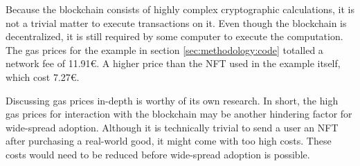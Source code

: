 Because the blockchain consists of highly complex cryptographic calculations, it is not a trivial matter to execute transactions on it. Even though the blockchain is decentralized, it is still required by some computer to execute the computation. The gas prices for the example in section \ref{sec:methodology:code} totalled a network fee of 11.91€. A higher price than the NFT used in the example itself, which cost 7.27€.

Discussing gas prices in-depth is worthy of its own research. In short, the high gas prices for interaction with the blockchain may be another hindering factor for wide-spread adoption. Although it is technically trivial to send a user an NFT after purchasing a real-world good, it might come with too high costs. These costs would need to be reduced before wide-spread adoption is possible.



